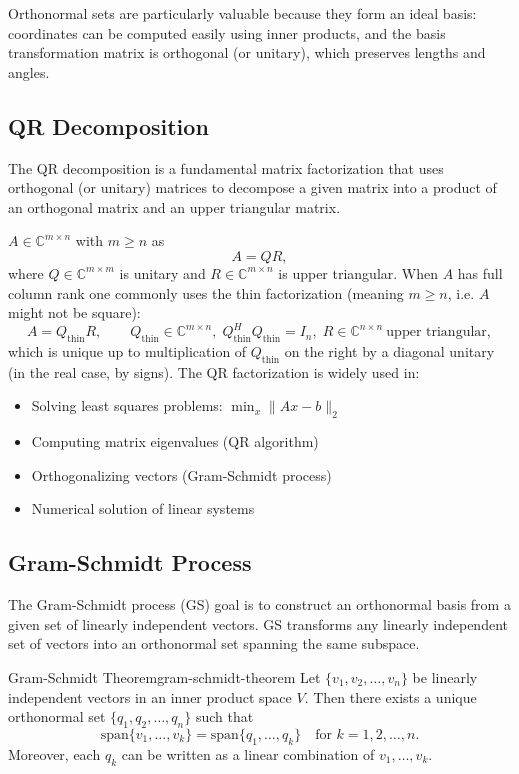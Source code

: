 Orthonormal sets are particularly valuable because they form an ideal basis: coordinates can be computed easily using inner products, and the basis transformation matrix is orthogonal (or unitary), which preserves lengths and angles.

\subsection{QR Decomposition}
The QR decomposition is a fundamental matrix factorization that uses orthogonal (or unitary) matrices to decompose a given matrix into a product of an orthogonal matrix and an upper triangular matrix.


$A\in\mathbb{C}^{m\times n}$ with $m\ge n$ as
\[
    A = QR,
\]
where $Q\in\mathbb{C}^{m\times m}$ is unitary and $R\in\mathbb{C}^{m\times n}$ is upper triangular.
When $A$ has full column rank one commonly uses the thin factorization (meaning $m\ge n$, i.e. $A$ might not be square):
\[
    A = Q_{\mathrm{thin}} R,\qquad Q_{\mathrm{thin}}\in\mathbb{C}^{m\times n},\;Q_{\mathrm{thin}}^H Q_{\mathrm{thin}}=I_n,\;R\in\mathbb{C}^{n\times n}\ \text{upper triangular},
\]
which is unique up to multiplication of $Q_{\mathrm{thin}}$ on the right by a diagonal unitary (in the real case, by signs). The QR factorization is widely used in:
\begin{itemize}
    \item Solving least squares problems: $\min_x \|Ax - b\|_2$
    \item Computing matrix eigenvalues (QR algorithm)
    \item Orthogonalizing vectors (Gram-Schmidt process)
    \item Numerical solution of linear systems
\end{itemize}

\subsection{Gram-Schmidt Process}
The Gram-Schmidt process (GS) goal is to construct an orthonormal basis from a given set of linearly independent vectors.
GS transforms any linearly independent set of vectors into an orthonormal set spanning the same subspace.

\begin{theorem}{Gram-Schmidt Theorem}{gram-schmidt-theorem}
    Let $\{v_1, v_2, \ldots, v_n\}$ be linearly independent vectors in an inner product space $V$. Then there exists a unique orthonormal set $\{q_1, q_2, \ldots, q_n\}$ such that
    \[
        \text{span}\{v_1, \ldots, v_k\} = \text{span}\{q_1, \ldots, q_k\} \quad \text{for } k = 1, 2, \ldots, n.
    \]
    Moreover, each $q_k$ can be written as a linear combination of $v_1, \ldots, v_k$.
\end{theorem}

